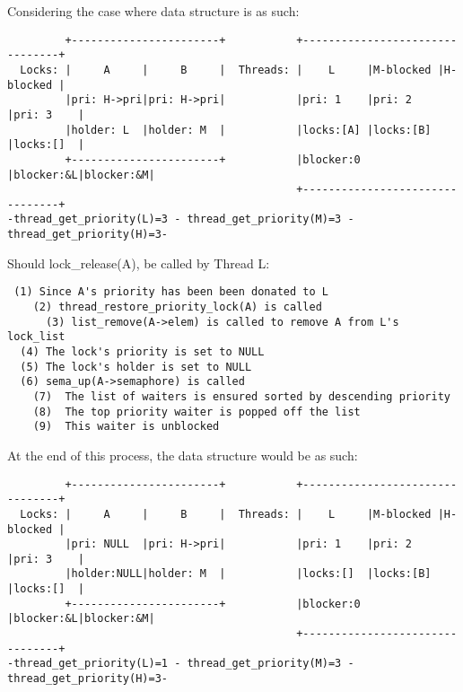\documentclass[a4wide, 11pt]{article}
\begin{document}
Considering the case where data structure is as such:

\begin{verbatim}
         +-----------------------+           +--------------------------------+
  Locks: |     A     |     B     |  Threads: |    L     |M-blocked |H-blocked |
         |pri: H->pri|pri: H->pri|           |pri: 1    |pri: 2    |pri: 3    |
         |holder: L  |holder: M  |           |locks:[A] |locks:[B] |locks:[]  |
         +-----------------------+           |blocker:0 |blocker:&L|blocker:&M|
                                             +--------------------------------+
-thread_get_priority(L)=3 - thread_get_priority(M)=3 - thread_get_priority(H)=3-
\end{verbatim}

Should lock\_release(A), be called by Thread L:
\begin{verbatim}
 (1) Since A's priority has been been donated to L
    (2) thread_restore_priority_lock(A) is called
      (3) list_remove(A->elem) is called to remove A from L's lock_list
  (4) The lock's priority is set to NULL
  (5) The lock's holder is set to NULL
  (6) sema_up(A->semaphore) is called
    (7)  The list of waiters is ensured sorted by descending priority
    (8)  The top priority waiter is popped off the list
    (9)  This waiter is unblocked
\end{verbatim}

At the end of this process, the data structure would be as such:

\begin{verbatim}
         +-----------------------+           +--------------------------------+
  Locks: |     A     |     B     |  Threads: |    L     |M-blocked |H-blocked |
         |pri: NULL  |pri: H->pri|           |pri: 1    |pri: 2    |pri: 3    |
         |holder:NULL|holder: M  |           |locks:[]  |locks:[B] |locks:[]  |
         +-----------------------+           |blocker:0 |blocker:&L|blocker:&M|
                                             +--------------------------------+
-thread_get_priority(L)=1 - thread_get_priority(M)=3 - thread_get_priority(H)=3-
\end{verbatim}
\newpage
\end{document}
